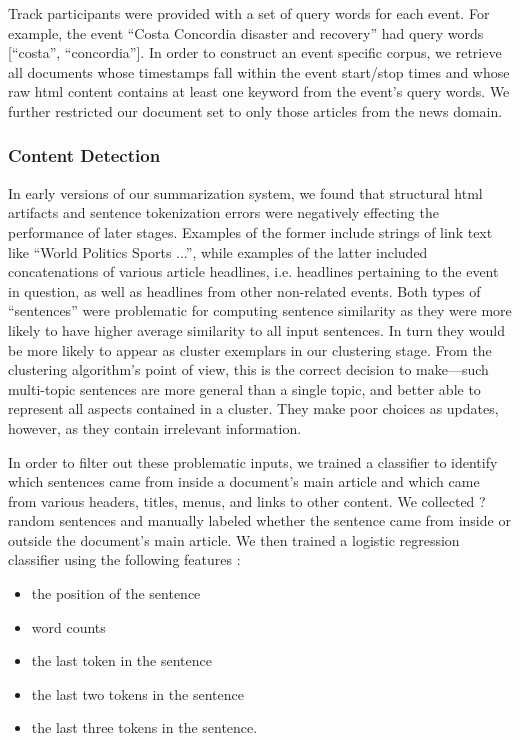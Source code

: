 Track participants were provided with a set of query words for each event.
For example, the event ``Costa Concordia disaster and recovery'' had query
words [``costa'', ``concordia''].
In order to construct an event specific corpus,
we retrieve all documents whose timestamps fall within the event start/stop 
times and whose raw html content contains at least one keyword from the 
event's query words. We further restricted our document set to only those 
articles from the news domain.


\subsubsection{Content Detection}\label{subsec:Content Detection}

In early versions of our summarization system, we found that structural html
artifacts and sentence tokenization errors
were negatively effecting the performance of later stages. Examples of the 
former include strings of link text like ``World Politics Sports ...'', while
examples of the latter included concatenations of various article headlines,
i.e. headlines pertaining to the event in question, as well as headlines from
other non-related events.
Both types of ``sentences'' were problematic for computing sentence similarity
as they were more likely to have higher average similarity to all input 
sentences. In turn they would be more likely to appear as cluster exemplars
in our clustering stage. From the clustering algorithm's point of view, this
is the correct decision to make---such multi-topic sentences are more general 
than a single topic, and better able to represent all aspects contained in a 
cluster. They make poor choices as updates, however, as they contain 
irrelevant information.

In order to filter out these problematic inputs, we trained a classifier to 
identify which sentences came from inside a document's main article and which
came from various headers, titles, menus, and links to other content. We collected ? random sentences and manually labeled whether the sentence came from
inside or outside the document's main article. We then trained a logistic 
regression classifier using the following features :

\begin{itemize}
 \item the position of the sentence
 \item word counts
 \item the last token in the sentence
 \item the last two tokens in the sentence
 \item the last three tokens in the sentence.
\end{itemize} 


